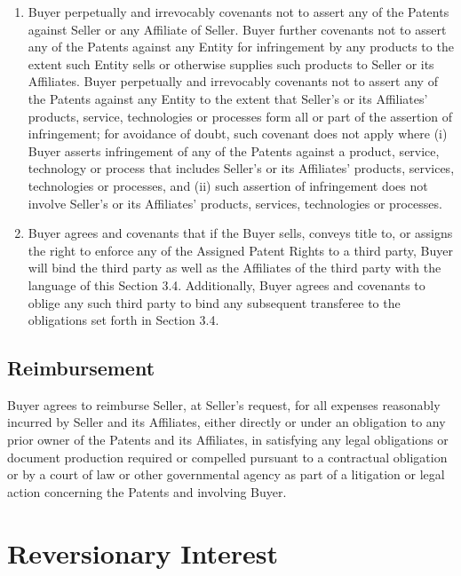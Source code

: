 \documentclass[letterpaper,10pt,english]{sphinxmanual}
\begin{document}
\begin{enumerate}
\item {} 
Buyer perpetually and irrevocably covenants not to assert any of the Patents against Seller or any Affiliate of Seller. Buyer further covenants not to assert any of the Patents against any Entity for infringement by any products to the extent such Entity sells or otherwise supplies such products to Seller or its Affiliates. Buyer perpetually and irrevocably covenants not to assert any of the Patents against any Entity to the extent that Seller’s or its Affiliates’ products, service, technologies or processes form all or part of the assertion of infringement; for avoidance of doubt, such covenant does not apply where (i) Buyer asserts infringement of any of the Patents against a product, service, technology or process that includes Seller’s or its Affiliates’ products, services, technologies or processes, and (ii) such assertion of infringement does not involve Seller’s or its Affiliates’ products, services, technologies or processes.

\item {} 
Buyer agrees and covenants that if the Buyer sells, conveys title to, or assigns the right to enforce any of the Assigned Patent Rights to a third party, Buyer will bind the third party as well as the Affiliates of the third party with the language of this Section 3.4. Additionally, Buyer agrees and covenants to oblige any such third party to bind any subsequent transferee to the obligations set forth in Section 3.4.

\end{enumerate}


\subsection{Reimbursement}
\label{\detokenize{3-transfer:reimbursement}}
Buyer agrees to reimburse Seller, at Seller’s request, for all expenses reasonably incurred by Seller and its Affiliates, either directly or under an obligation to any prior owner of the Patents and its Affiliates, in satisfying any legal obligations or document production required or compelled pursuant to a contractual obligation or by a court of law or other governmental agency as part of a litigation or legal action concerning the Patents and involving Buyer.


\section{Reversionary Interest}
\label{\detokenize{4-reversionary:reversionary-interest}}\label{\detokenize{4-reversionary::doc}}
\end{document}
